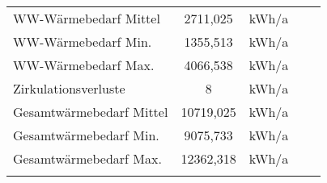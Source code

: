 \begin{table}[]
{\begin{tabular}{lclcc}
    \multicolumn{1}{|l|}{WW-Wärmebedarf Mittel}                                          & \multicolumn{1}{c|}{2711,025}                              & \multicolumn{1}{l|}{kWh/a}                                    &                                               &                                               \\ \cline{1-3}
    \multicolumn{1}{|l|}{WW-Wärmebedarf Min.}                                            & \multicolumn{1}{c|}{1355,513}                              & \multicolumn{1}{l|}{kWh/a}                                    &                                               &                                               \\ \cline{1-3}
    \multicolumn{1}{|l|}{WW-Wärmebedarf Max.}                                            & \multicolumn{1}{c|}{4066,538}                              & \multicolumn{1}{l|}{kWh/a}                                    &                                               &                                               \\ \cline{1-3}
    \multicolumn{1}{|l|}{Zirkulationsverluste}                                           & \multicolumn{1}{c|}{8}                                     & \multicolumn{1}{l|}{kWh/a}                                    &                                               &                                               \\ \cline{1-3}
    \multicolumn{1}{|l|}{Gesamtwärmebedarf Mittel}                                       & \multicolumn{1}{c|}{10719,025}                             & \multicolumn{1}{l|}{kWh/a}                                    &                                               &                                               \\ \cline{1-3}
    \multicolumn{1}{|l|}{Gesamtwärmebedarf Min.}                                         & \multicolumn{1}{c|}{9075,733}                              & \multicolumn{1}{l|}{kWh/a}                                    &                                               &                                               \\ \cline{1-3}
    \multicolumn{1}{|l|}{Gesamtwärmebedarf Max.}                                         & \multicolumn{1}{c|}{12362,318}                             & \multicolumn{1}{l|}{kWh/a}                                    &                                               &                                               \\ \cline{1-3}
                                                                                         &                                                            &                                                               &                                               &                                               \\ \hline

\end{tabular}}
\end{table}

